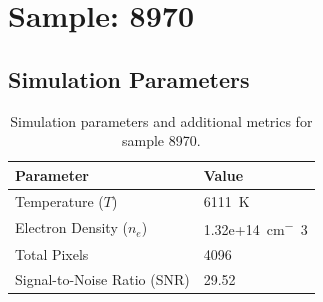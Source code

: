 \documentclass[a4paper,11pt]{article}
\begin{document}
\clearpage

\section{Sample: 8970}
\subsection{Simulation Parameters}
\begin{table}[h!]
    \centering
    \begin{tabular}{ll}
        \toprule
        \textbf{Parameter} & \textbf{Value} \\
        \midrule
        Temperature ($T$) & 6111 \,\si{K} \\
        Electron Density ($n_e$) & 1.32e+14 \,\si{cm^-3} \\
        Total Pixels & 4096 \\
        Signal-to-Noise Ratio (SNR) & 29.52 \\
        \bottomrule
    \end{tabular}
    \caption{Simulation parameters and additional metrics for sample 8970.}
    \label{tab:params_8970}
\end{table}
\end{document}
